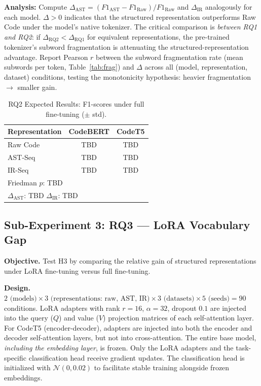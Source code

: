 \documentclass[pdflatex,sn-mathphys,Numbered]{sn-jnl}
\newcommand{\RQTwoRawF}{TBD}        %
\newcommand{\RQTwoASTF}{TBD}        %
\newcommand{\RQTwoIRF}{TBD}         %
\newcommand{\RQTwoPval}{TBD}        %
\newcommand{\RQTwoDeltaAST}{TBD}    %
\newcommand{\RQTwoDeltaIR}{TBD}     %
\begin{document}
\textbf{Analysis:} Compute $\Delta_{\text{AST}} = (F1_{\text{AST}} - F1_{\text{Raw}}) / F1_{\text{Raw}}$ and $\Delta_{\text{IR}}$ analogously for each model. $\Delta > 0$ indicates that the structured representation outperforms Raw Code under the model's native tokenizer. The critical comparison is \emph{between RQ1 and RQ2}: if $\Delta_{\text{RQ2}} < \Delta_{\text{RQ1}}$ for equivalent representations, the pre-trained tokenizer's subword fragmentation is attenuating the structured-representation advantage. Report Pearson $r$ between the subword fragmentation rate (mean subwords per token, Table~\ref{tab:frag}) and $\Delta$ across all (model, representation, dataset) conditions, testing the monotonicity hypothesis: heavier fragmentation $\rightarrow$ smaller gain.

\begin{table}[tb]
\centering
\caption{RQ2 Expected Results: F1-scores under full fine-tuning ($\pm$ std).}\label{tab:rq2}
\begin{tabular}{lcc}
\toprule
Representation & CodeBERT & CodeT5 \\
\midrule
Raw Code  & \RQTwoRawF{} & \RQTwoRawF{} \\
AST-Seq   & \RQTwoASTF{} & \RQTwoASTF{} \\
IR-Seq    & \RQTwoIRF{}  & \RQTwoIRF{} \\
\midrule
\multicolumn{3}{l}{Friedman $p$: \RQTwoPval{}} \\
\multicolumn{3}{l}{$\Delta_{\text{AST}}$: \RQTwoDeltaAST{} \quad $\Delta_{\text{IR}}$: \RQTwoDeltaIR{}} \\
\bottomrule
\end{tabular}
\end{table}

\subsection{Sub-Experiment 3: RQ3 --- LoRA Vocabulary Gap}

\textbf{Objective.} Test H3 by comparing the relative gain of structured representations under LoRA fine-tuning versus full fine-tuning.

\textbf{Design.} $2 \text{ (models)} \times 3 \text{ (representations: raw, AST, IR)} \times 3 \text{ (datasets)} \times 5 \text{ (seeds)} = 90$ conditions. LoRA adapters with rank $r = 16$, $\alpha = 32$, dropout $0.1$ are injected into the query ($Q$) and value ($V$) projection matrices of each self-attention layer. For CodeT5 (encoder-decoder), adapters are injected into both the encoder and decoder self-attention layers, but not into cross-attention. The entire base model, \emph{including the embedding layer}, is frozen. Only the LoRA adapters and the task-specific classification head receive gradient updates. The classification head is initialized with $\mathcal{N}(0, 0.02)$ to facilitate stable training alongside frozen embeddings.
\end{document}
